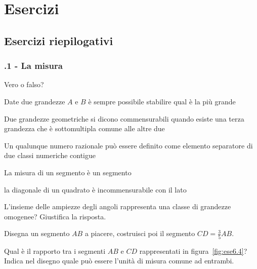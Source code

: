 \section{Esercizi}

\subsection{Esercizi riepilogativi}

\subsubsection*{\thechapter.1 - La misura}

\begin{esercizio}
\label{ese:6.1}
Vero o falso?
\begin{enumeratea}
\item Date due grandezze $A$ e $B$ è sempre possibile stabilire qual è la più grande\hfill\boxV\quad\boxF
\item Due grandezze geometriche si dicono commensurabili quando esiste una terza grandezza che è sottomultipla comune alle altre due \tab\hfill{\boxV\quad\boxF}
\item Un qualunque numero razionale può essere definito come elemento separatore di due classi numeriche contigue\hfill\boxV\quad\boxF
\item La misura di un segmento è un segmento\hfill\boxV\quad\boxF
\item la diagonale di un quadrato è incommensurabile con il lato\hfill\boxV\quad\boxF
\end{enumeratea}
\end{esercizio}

\begin{esercizio}
\label{ese:6.2}
L'insieme delle ampiezze degli angoli rappresenta una classe di grandezze omogenee? Giustifica la risposta.
\end{esercizio}

\begin{esercizio}
\label{ese:6.3}
Disegna un segmento $AB$ a piacere, costruisci poi il segmento $CD=\frac{3}{5}AB$.
\end{esercizio}

\begin{esercizio}
\label{ese:6.4}
Qual è il rapporto tra i segmenti $AB$ e $CD$ rappresentati in figura~\ref{fig:ese6.4}? Indica nel disegno quale può essere l'unità di misura comune ad entrambi.
\end{esercizio}

